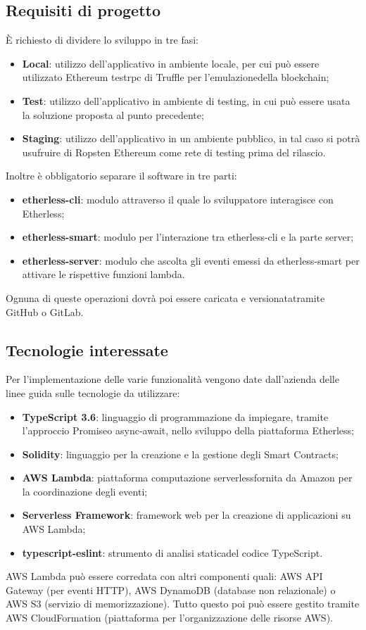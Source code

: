 \subsection{Requisiti di progetto}
È richiesto di dividere lo sviluppo in tre fasi:
\begin{itemize}
   	\item \textbf{Local}: utilizzo dell'applicativo in ambiente locale, per cui può essere utilizzato Ethereum testrpc di Truffle per
   	l'emulazione\glosp della blockchain;
   	\item \textbf{Test}: utilizzo dell'applicativo in ambiente di testing, in cui può essere usata la soluzione proposta al punto precedente;
   	\item \textbf{Staging}: utilizzo dell'applicativo in un ambiente pubblico, in tal caso si potrà usufruire di Ropsten Ethereum come rete di testing prima del rilascio.
\end{itemize}
Inoltre è obbligatorio separare il software in tre parti:
\begin{itemize}
   	\item \textbf{etherless-cli}: modulo attraverso il quale lo sviluppatore interagisce con Etherless;
   	\item \textbf{etherless-smart}: modulo per l'interazione tra etherless-cli e la parte server;
   	\item \textbf{etherless-server}: modulo che ascolta gli eventi emessi da etherless-smart per attivare le rispettive funzioni lambda\glo. 
\end{itemize}
Ognuna di queste operazioni dovrà poi essere caricata e versionata\glosp tramite GitHub o GitLab.
\subsection{Tecnologie interessate}
    Per l'implementazione delle varie funzionalità vengono date dall'azienda delle linee guida sulle tecnologie da utilizzare:
    \begin{itemize}
        \item \textbf{TypeScript 3.6}: linguaggio di programmazione da impiegare, tramite l'approccio Promise\glosp o async-await\glo, nello sviluppo della piattaforma Etherless;
        \item \textbf{Solidity}: linguaggio per la creazione e la gestione degli Smart Contracts\glo;
        \item \textbf{AWS Lambda}: piattaforma computazione serverless\glosp fornita da Amazon per la coordinazione degli eventi;
        \item \textbf{Serverless Framework}: framework web per la creazione di applicazioni su AWS Lambda;
        \item \textbf{typescript-eslint}: strumento di analisi statica\glosp del codice TypeScript.
    \end{itemize}
    AWS Lambda può essere corredata con altri componenti quali: AWS API Gateway (per eventi HTTP), AWS DynamoDB (database non relazionale)
    o AWS S3 (servizio di memorizzazione). Tutto questo poi può essere gestito tramite AWS CloudFormation (piattaforma per l'organizzazione delle
    risorse AWS).
